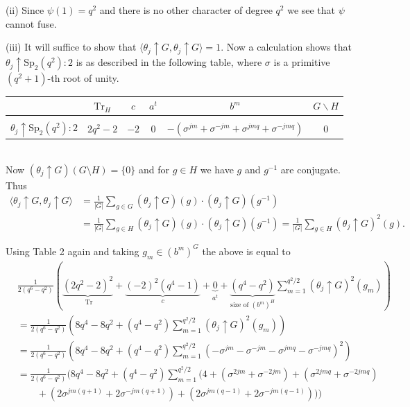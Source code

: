 \documentclass[10pt,a4paper]{amsart}
\theoremstyle{plain}
\theoremstyle{definition}
\numberwithin{equation}{section}
\begin{document}
\noindent (ii) Since $\psi(1)=q^2$ and there is no other character of degree $q^2$ we see that $\psi$ cannot fuse.

\noindent (iii)  It will suffice to show that $\langle \theta_j \uparrow G,\theta_j \uparrow G\rangle=1$. 
Now a calculation shows that $\theta_j \uparrow \mathrm{Sp}_2(q^2)\colon 2$ 
is as  described in the following  table, where $\sigma$ is a primitive $(q^2+1)$-th root of unity. 
\\[5mm]
\begin{tabular}{c|ccccc}
 & $\text{Tr}_H$ & $c$ & $a^t$ & $b^m$ & $G \smallsetminus H$\\
\hline\\
$\theta_j \uparrow \mathrm{Sp}_2(q^2)\colon 2$ & $2q^2-2$ & $-2$ & $0$ & $-(\sigma^{jm} + \sigma^{-jm}+\sigma^{jmq} + \sigma^{-jmq})$ & $0$
\end{tabular}
\\[5mm]
Now 
$(\theta_j\uparrow G)(G \setminus H)=\{0\}$ and 
for $g \in H$ we have $g$ and $g^{-1}$ are conjugate. Thus 
\begin{align*}
\langle \theta_j\uparrow G, \theta_j\uparrow G\rangle &= \frac{1}{|G|} \sum_{g\in G}(\theta_j\uparrow G)(g)\cdot (\theta_j\uparrow G)\left(g^{-1}\right)\\&=
\frac{1}{|G|} \sum_{g\in H}(\theta_j\uparrow G)(g)\cdot (\theta_j\uparrow G)(g^{-1})
=\frac{1}{|G|} \sum_{g\in H}(\theta_j\uparrow G)^2(g).
\end{align*}

Using Table 2 again and taking $g_m \in (b^m)^G$  the above is equal to
\begin{align*}&
\frac{1}{2(q^6-q^2)}\left(\underbrace{(2q^2-2)^2}_{\text{ Tr}} + \underbrace{(-2)^2(q^4-1)}_{c} + \underbrace{0}_{\text{$a^t$}}+\underbrace{(q^4-q^2)}_{\text{size of $(b^m)^H$}} {\sum_{m=1}^{q^2/2}}\left(\theta_j\uparrow G\right)^2(g_m)\right)
\\&=
\frac{1}{2(q^6-q^2)}\left({8q^4-8q^2} + {(q^4-q^2)} {\sum_{m=1}^{q^2/2}}  {\left(\theta_j\uparrow G\right)^2(g_m)}\right)
\\&=
\frac{1}{2(q^6-q^2)}\left(8q^4-8q^2+(q^4-q^2)\sum_{m=1}^{q^2/2}\left(-\sigma^{jm}-\sigma^{-jm}-\sigma^{jmq}-\sigma^{-jmq}\right)^2\right)
\\&=
\frac{1}{2(q^6-q^2)}
\bigg (
8q^4-8q^2+(q^4-q^2)\sum_{m=1}^{q^2/2}
\big (
4 +  {(\sigma^{2jm}+\sigma^{-2jm})}+ (\sigma^{2jmq} +\sigma^{-2jmq})\\&\qquad  + (2\sigma^{jm(q+1)} + 2\sigma^{-jm(q+1)}) + (2\sigma^{jm(q-1)} + 2\sigma^{-jm(q-1)})
\big )
\bigg )
\end{align*}
 
\end{document}

